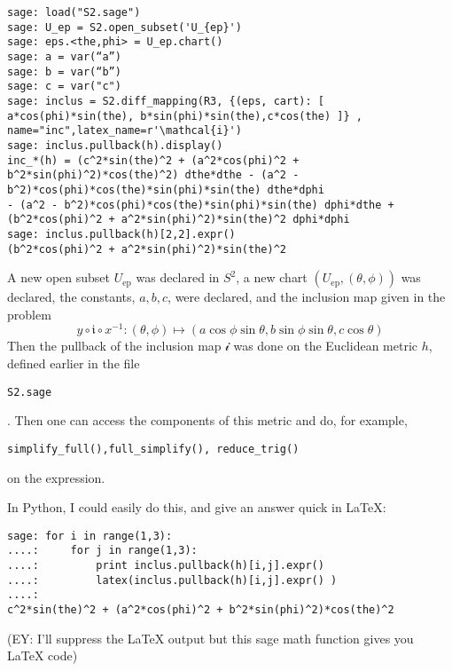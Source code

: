 {\scriptsize \begin{verbatim}
sage: load("S2.sage")
sage: U_ep = S2.open_subset('U_{ep}')
sage: eps.<the,phi> = U_ep.chart()
sage: a = var(“a”)
sage: b = var(“b”)
sage: c = var("c")
sage: inclus = S2.diff_mapping(R3, {(eps, cart): [ a*cos(phi)*sin(the), b*sin(phi)*sin(the),c*cos(the) ]} , name="inc",latex_name=r'\mathcal{i}')
sage: inclus.pullback(h).display()
inc_*(h) = (c^2*sin(the)^2 + (a^2*cos(phi)^2 + b^2*sin(phi)^2)*cos(the)^2) dthe*dthe - (a^2 - b^2)*cos(phi)*cos(the)*sin(phi)*sin(the) dthe*dphi 
- (a^2 - b^2)*cos(phi)*cos(the)*sin(phi)*sin(the) dphi*dthe + (b^2*cos(phi)^2 + a^2*sin(phi)^2)*sin(the)^2 dphi*dphi
sage: inclus.pullback(h)[2,2].expr()
(b^2*cos(phi)^2 + a^2*sin(phi)^2)*sin(the)^2
\end{verbatim}
}
A new open subset $U_{\text{ep}}$ was declared in $S^2$, a new chart $(U_{\text{ep}}, (\theta,\phi))$ was declared, the constants, $a,b,c$, were declared, and the inclusion map given in the problem
\[
y\circ \mathfrak{i} \circ x^{-1} : (\theta, \phi) \mapsto ( a\cos{\phi} \sin{\theta}, b \sin{\phi} \sin{\theta}, c\cos{\theta})
\]
Then the pullback of the inclusion map $\mathcal{i}$ was done on the Euclidean metric $h$, defined earlier in the file \begin{verbatim}S2.sage\end{verbatim}.  Then one can access the components of this metric and do, for example, \begin{verbatim}simplify_full(),full_simplify(), reduce_trig()\end{verbatim} on the expression.  

In Python, I could easily do this, and give an answer quick in LaTeX:

\begin{verbatim}
sage: for i in range(1,3): 
....:     for j in range(1,3):
....:         print inclus.pullback(h)[i,j].expr()
....:         latex(inclus.pullback(h)[i,j].expr() )
....:         
c^2*sin(the)^2 + (a^2*cos(phi)^2 + b^2*sin(phi)^2)*cos(the)^2
\end{verbatim}
(EY: I'll suppress the LaTeX output but this sage math function gives you LaTeX code)
%
%

